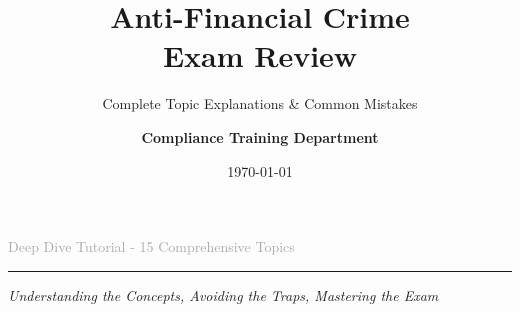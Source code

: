 \documentclass[8pt]{beamer}  %
\title{\Huge Anti-Financial Crime \\[0.2cm] \Large Exam Review}
\subtitle{\large Complete Topic Explanations \& Common Mistakes}
\author{\textbf{Compliance Training Department}}
\institute{Professional Development Program}
\date{\today}
\begin{document}
	
	\begin{frame}
		\titlepage
		\begin{center}
			\vspace{0.5cm}
			\large \textcolor{darkgray}{Deep Dive Tutorial - 15 Comprehensive Topics}
			\vspace{0.3cm}
			
			\rule{8cm}{1pt}
			\vspace{0.3cm}
			
			\textit{Understanding the Concepts, Avoiding the Traps, Mastering the Exam}
		\end{center}
	\end{frame}
	
\end{document}
